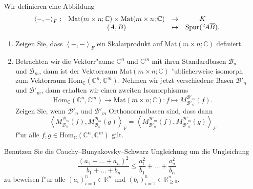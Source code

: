 \documentclass[a4,11pt]{article}
\begin{document}
\begin{aufgabe}[4 Punkte]
Wir definieren eine Abbildung 
$$
\begin{array}{rccc}
  \left<-,-\right>_{F} : & \text{Mat}(m \times n; \mathbb{C})
                           \times\text{Mat}(m \times n; \mathbb{C}) &
                                                                      \to
  & K \\
                         & (A,B) & \mapsto & \text{Spur}(\,^t\!A \overline{B}).
\end{array}
$$

\begin{enumerate}
\item Zeigen Sie, dass $\left<-,-\right>_{F}$ ein Skalarprodukt auf
  $\text{Mat}(m \times n; \mathbb{C})$ definiert.
\item Betrachten wir die Vektorr"aume $\mathbb{C}^n$ und
  $\mathbb{C}^m$ mit ihren Standardbasen $\mathcal{B}_n$ und
  $\mathcal{B}_m$, dann ist der Vektorraum $\text{Mat}(m \times n;
  \mathbb{C})$ "ublicherweise isomorph zum Vektorraum
  $\text{Hom}_\mathbb{C}(\mathbb{C}^n, \mathbb{C}^m)$. Nehmen wir
  jetzt verschiedene Basen $\mathcal{B}'_n$ und $\mathcal{B}'_m$, dann
  erhalten wir einen zweiten Isomorphismus
\[
\text{Hom}_\mathbb{C}(\mathbb{C}^n, \mathbb{C}^m) \to \text{Mat}(m
\times n; \mathbb{C}) : f \mapsto
M_{\mathcal{B}'_n}^{\mathcal{B}'_m}(f).
\]
Zeigen Sie, wenn $\mathcal{B}'_n$ und $\mathcal{B}'_m$
Orthonormalbasen sind, dass dann
\[
\left<M_{\mathcal{B}_n}^{\mathcal{B}_m}(f),M_{\mathcal{B}_n}^{\mathcal{B}_m}(g)\right>_{F}
=
\left<M_{\mathcal{B}'_n}^{\mathcal{B}'_m}(f),M_{\mathcal{B}'_n}^{\mathcal{B}'_m}(g)\right>_{F}
\]
f"ur alle $f, g \in \text{Hom}_\mathbb{C}(\mathbb{C}^n, \mathbb{C}^m)$ gilt.
\end{enumerate}
\end{aufgabe}

\begin{aufgabe}[4 Punkte]
Benutzen Sie die Cauchy–Bunyakovsky–Schwarz Ungleichung um die Ungleichung
\[
\frac{(a_1 + \dots +  a_n)^2}{b_1 + \dots + b_n} \leq \frac{a_1^2}{b_1} + \dots + \frac{a_n^2}{b_n}
\]
zu beweisen f"ur alle $(a_i)_{i = 1}^n \in \mathbb{R}^n$ und $(b_i)_{i=1}^n \in \mathbb{R}^n_{\geq 0}$.
\end{aufgabe}
\end{document}
